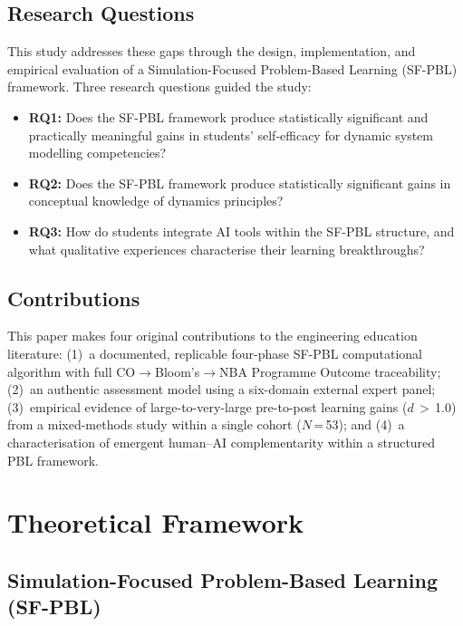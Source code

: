 \documentclass[utf8]{FrontiersinHarvard}
\begin{document}
\subsection{Research Questions}

This study addresses these gaps through the design, implementation, and
empirical evaluation of a Simulation-Focused Problem-Based Learning
(SF-PBL) framework. Three research questions guided the study:

\begin{itemize}\setlength{\itemsep}{0pt}\setlength{\parskip}{0pt}
  \item \textbf{RQ1:} Does the SF-PBL framework produce statistically
    significant and practically meaningful gains in students' self-efficacy
    for dynamic system modelling competencies?
  \item \textbf{RQ2:} Does the SF-PBL framework produce statistically
    significant gains in conceptual knowledge of dynamics principles?
  \item \textbf{RQ3:} How do students integrate AI tools within the
    SF-PBL structure, and what qualitative experiences characterise their
    learning breakthroughs?
\end{itemize}

\subsection{Contributions}

This paper makes four original contributions to the engineering education
literature: (1)~a documented, replicable four-phase SF-PBL computational
algorithm with full CO$\rightarrow$Bloom's$\rightarrow$NBA Programme
Outcome traceability; (2)~an authentic assessment model using a
six-domain external expert panel; (3)~empirical evidence of large-to-very-large
pre-to-post learning gains ($d$\,$>$\,1.0) from a mixed-methods study
within a single cohort ($N$\,=\,53); and (4)~a characterisation of emergent human--AI
complementarity within a structured PBL framework.

\section{Theoretical Framework}

\subsection{Simulation-Focused Problem-Based Learning (SF-PBL)}
\end{document}
